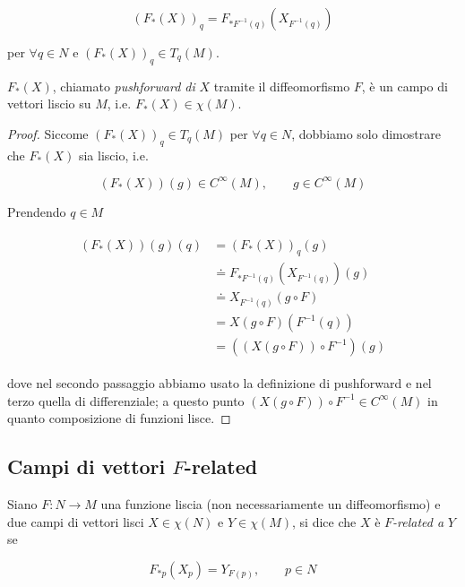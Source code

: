 \begin{equation}
	(F_{*} (X))_{q} = F_{*F^{-1}(q)} (X_{F^{-1}(q)})
\end{equation}

per $ \forall q \in N $ e $ (F_{*} (X))_{q} \in T_{q}(M) $. 

\begin{definition}
	$ F_{*}(X) $, chiamato \textit{pushforward di} $ X $ tramite il diffeomorfismo $ F $, è un campo di vettori liscio su $ M $, i.e. $ F_{*}(X) \in \chi(M) $.
\end{definition}

\begin{proof}
	Siccome $ (F_{*} (X))_{q} \in T_{q}(M) $ per $ \forall q \in N $, dobbiamo solo dimostrare che $ F_{*}(X) $ sia liscio, i.e.
	
	\begin{equation}
		(F_{*}(X))(g) \in C^{\infty}(M), \qquad g \in C^{\infty}(M)
	\end{equation}

	Prendendo $ q \in M $
	
	\begin{align}
		\begin{split}
			(F_{*}(X))(g)(q) &= (F_{*}(X))_{q}(g)\\
			&\doteq F_{*F^{-1}(q)} (X_{F^{-1}(q)})(g)\\
			&\doteq X_{F^{-1}(q)} (g \circ F)\\
			&= X (g \circ F)(F^{-1}(q))\\
			&= ((X (g \circ F)) \circ F^{-1})(g)
		\end{split}
	\end{align}

	dove nel secondo passaggio abbiamo usato la definizione di pushforward e nel terzo quella di differenziale; a questo punto $ (X (g \circ F)) \circ F^{-1} \in C^{\infty}(M) $ in quanto composizione di funzioni lisce.
\end{proof}

\subsection{Campi di vettori $ F $-related}

Siano $ F : N \to M $ una funzione liscia (non necessariamente un diffeomorfismo) e due campi di vettori lisci $ X \in \chi(N) $ e $ Y \in \chi(M) $, si dice che $ X $ è $ F $\textit{-related a} $ Y $ se

\begin{equation}
	F_{*p}(X_{p}) = Y_{F(p)}, \qquad p \in N
\end{equation}


